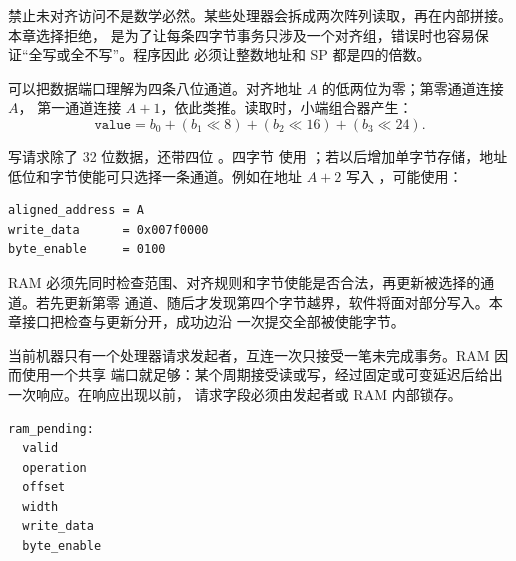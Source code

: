 禁止未对齐访问不是数学必然。某些处理器会拆成两次阵列读取，再在内部拼接。本章选择拒绝，
是为了让每条四字节事务只涉及一个对齐组，错误时也容易保证“全写或全不写”。程序因此
必须让整数地址和 SP 都是四的倍数。


可以把数据端口理解为四条八位通道。对齐地址 \(A\) 的低两位为零；第零通道连接 \(A\)，
第一通道连接 \(A+1\)，依此类推。读取时，小端组合器产生：
\[
\texttt{value}=
b_0+(b_1\ll8)+(b_2\ll16)+(b_3\ll24).
\]

\begin{center}
\end{center}


写请求除了 32 位数据，还带四位 。四字节  使用
；若以后增加单字节存储，地址低位和字节使能可只选择一条通道。例如在地址
\(A+2\) 写入 ，可能使用：

\begin{lstlisting}
aligned_address = A
write_data      = 0x007f0000
byte_enable     = 0100
\end{lstlisting}

RAM 必须先同时检查范围、对齐规则和字节使能是否合法，再更新被选择的通道。若先更新第零
通道、随后才发现第四个字节越界，软件将面对部分写入。本章接口把检查与更新分开，成功边沿
一次提交全部被使能字节。


当前机器只有一个处理器请求发起者，互连一次只接受一笔未完成事务。RAM 因而使用一个共享
端口就足够：某个周期接受读或写，经过固定或可变延迟后给出一次响应。在响应出现以前，
请求字段必须由发起者或 RAM 内部锁存。

\begin{lstlisting}
ram_pending:
  valid
  operation
  offset
  width
  write_data
  byte_enable
\end{lstlisting}

